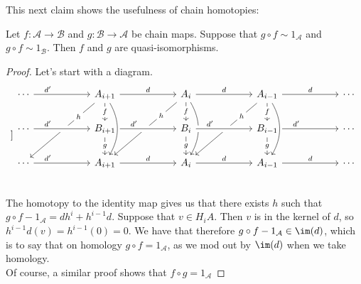 This next claim shows the usefulness of chain homotopies:
\begin{lemma} Let $f:\mathcal A\to\mathcal B$ and $g:\mathcal B\to\mathcal A$ be chain maps. Suppose that $g\circ f\sim 1_{\mathcal A}$ and $g\circ f \sim 1_{\mathcal B}$. Then $f$ and $g$ are quasi-isomorphisms.
\begin{proof}
Let's start with a diagram.
\[]\begin{tikzcd}[column sep=2cm]
\cdots \arrow[crossing over]{r}[near start]{d'} & A_{i+1} \arrow{r}{d}\arrow{ddl}[near start, description]{h} \arrow{d}[description]{f}\arrow[bend left]{dd}&  A_{i} \arrow{r}{d}\arrow{d}[description]{f}\arrow[bend left]{dd} \arrow{ddl}[near start, description]{h}& A_{i-1} \arrow{d}[description]{f}\arrow{r}{d}\arrow[bend left]{dd}\arrow{ddl}[near start, description]{h}& \cdots \\
\cdots \arrow[crossing over]{r}[near start]{d'} & B_{i+1} \arrow[crossing over]{r}[near start]{d'}\arrow{d}[description]{g}&  B_{i} \arrow[crossing over]{r}[near start]{d'}\arrow{d}[description]{g}& B_{i-1}\arrow{d}[description]{g}\arrow[crossing over]{r}[near start]{d'}& \cdots \\
\cdots \arrow[crossing over]{r}[near start]{d'} & A_{i+1} \arrow{r}{d}            &   A_{i} \arrow{r}{d}             & A_{i-1}\arrow{r}{d}             & \cdots \\
\end{tikzcd}\]
The homotopy to the identity map gives us that there exists $h$ such that $g\circ f- 1_{\mathcal A}=dh^{i}+h^{i-1}d$. Suppose that $v\in H_i{A}$. Then $v$ is in the kernel of $d$, so $h^{i-1}d(v)=h^{i-1}(0)=0$. We have that therefore $g\circ f - 1_{\mathcal A}\in \im(d)$, which is to say that on homology $g\circ f = 1_{\mathcal A}$, as we mod out by $\im(d)$ when we take homology.\\
Of course, a similar proof shows that $f\circ g=1_{\mathcal A}$
\end{proof}
\end{lemma}
